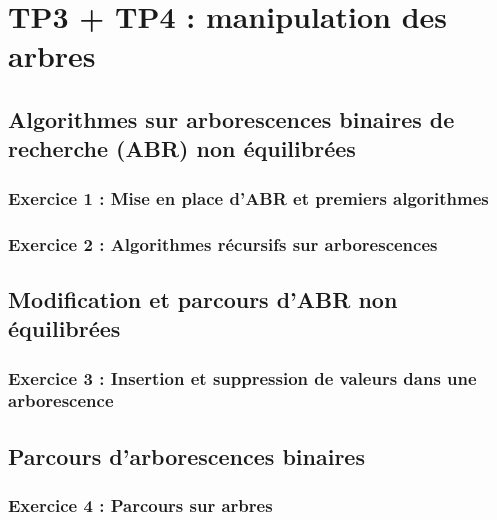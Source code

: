 \chapter{TP3 + TP4 : manipulation des arbres}
    \section{Algorithmes sur arborescences binaires de recherche (ABR) non équilibrées}
        \subsection{Exercice 1 : Mise en place d’ABR et premiers algorithmes}
        \subsection{Exercice 2 : Algorithmes récursifs sur arborescences}
    \section{Modification et parcours d’ABR non équilibrées}
        \subsection{Exercice 3 : Insertion et suppression de valeurs dans une arborescence}
    \section{Parcours d’arborescences binaires}
        \subsection{Exercice 4 : Parcours sur arbres}
